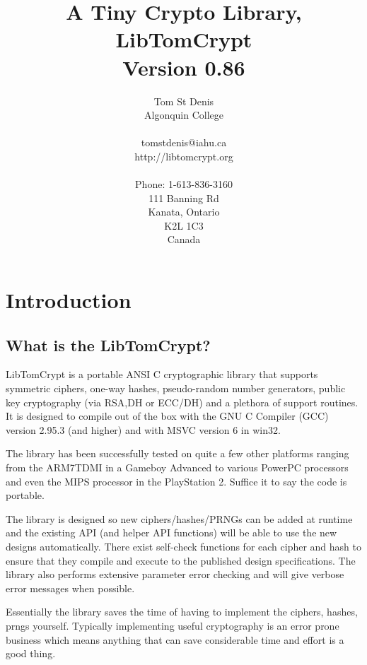 \documentclass{book}
\begin{document}
\title{A Tiny Crypto Library, \\ LibTomCrypt \\ Version 0.86}
\author{Tom St Denis \\
Algonquin College \\
\\
tomstdenis@iahu.ca \\
http://libtomcrypt.org \\ \\
Phone: 1-613-836-3160\\
111 Banning Rd \\
Kanata, Ontario \\
K2L 1C3 \\
Canada
}
\maketitle
\newpage
\tableofcontents
\chapter{Introduction}
\section{What is the LibTomCrypt?}
LibTomCrypt is a portable ANSI C cryptographic library that supports symmetric ciphers, one-way hashes, 
pseudo-random number generators, public key cryptography (via RSA,DH or ECC/DH) and a plethora of support 
routines.  It is designed to compile out of the box with the GNU C Compiler (GCC) version 2.95.3 (and higher) 
and with MSVC version 6 in win32.

The library has been successfully tested on quite a few other platforms ranging from the ARM7TDMI in a 
Gameboy Advanced to various PowerPC processors and even the MIPS processor in the PlayStation 2.  Suffice it
to say the code is portable.

The library is designed so new ciphers/hashes/PRNGs can be added at runtime and the existing API (and helper API functions) will 
be able to use the new designs automatically.  There exist self-check functions for each cipher and hash to ensure that
they compile and execute to the published design specifications.  The library also performs extensive parameter error checking
and will give verbose error messages when possible.

Essentially the library saves the time of having to implement the ciphers, hashes, prngs yourself.  Typically implementing
useful cryptography is an error prone business which means anything that can save considerable time and effort is a good
thing.
\end{document}
